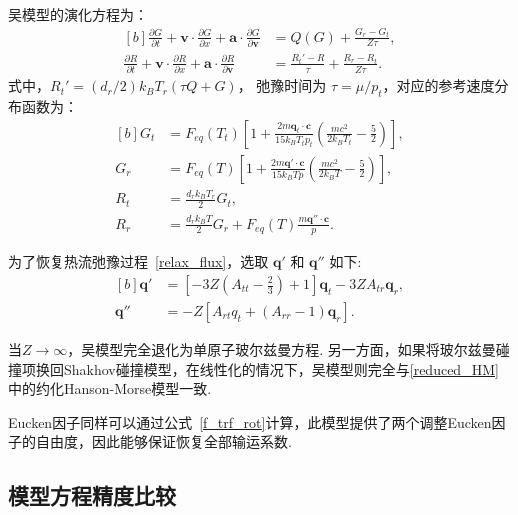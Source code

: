 吴模型的演化方程为：
\begin{equation}\label{Wu_model}
\begin{aligned}[b]
\frac{\partial G}{\partial t}+\bm{v}\cdot \frac{\partial G}{\partial x}+\bm{a}\cdot \frac{\partial G}{\partial \bm{v}}&=Q(G)+\frac{G_r-G_t}{ Z\tau  },\\
\frac{\partial R}{\partial t}+\bm{v}\cdot \frac{\partial R}{\partial x} +\bm{a}\cdot \frac{\partial R}{\partial \bm{v}}&=\frac{R_t'-R}{ \tau  }+\frac{R_r-R_t}{ Z\tau  }.
\end{aligned}
\end{equation}
式中，$ R_t'=(d_r/2)k_BT_r(\tau Q+G) $， 弛豫时间为 $\tau=\mu/p_t$，对应的参考速度分布函数为：
\begin{equation}
\begin{aligned}[b]
G_t&=F_{eq}(T_t)\left[1+\frac{2m{\bm{q}_{t}} \cdot \bm{c}}{15k_BT_tp_t}\left(\frac{mc^2}{2k_BT_t}-\frac{5}{2}\right)\right],\\
G_r&=F_{eq}(T)\left[1+\frac{2m\bm{q}' \cdot \bm{c}} {15k_BTp}\left(\frac{mc^2}{2k_BT}-\frac{5}{2}\right)\right],\\
R_t&=\frac{d_rk_BT_r}{2}G_t, \\
R_r&=\frac{d_rk_BT}{2}G_r+F_{eq}(T)\frac{m\bm{q}'' \cdot \bm{c}}{p}.
\end{aligned}
\end{equation}

为了恢复热流弛豫过程~\eqref{relax_flux}，选取 ${\bm{q}'}$ 和 ${\bm{q}''}$ 如下:
\begin{equation}
\begin{aligned}[b]
\bm{q}'&=\left[-3Z( A_{tt}-\frac{2}{3})+1\right]\bm{q}_{t}-3ZA_{tr}\bm{q}_{r},\\
\bm{q}''&=-Z\left[A_{rt} q_t+(A_{rr}-1)\bm{q}_{r}\right].
\end{aligned}
\end{equation}


当$Z\rightarrow\infty$，吴模型完全退化为单原子玻尔兹曼方程. 另一方面，如果将玻尔兹曼碰撞项换回Shakhov碰撞模型，在线性化的情况下，吴模型则完全与\ref{reduced_HM}中的约化Hanson-Morse模型一致.


Eucken因子同样可以通过公式~\eqref{f_trf_rot}计算，此模型提供了两个调整Eucken因子的自由度，因此能够保证恢复全部输运系数.


\subsection{模型方程精度比较}\label{sec:results}




